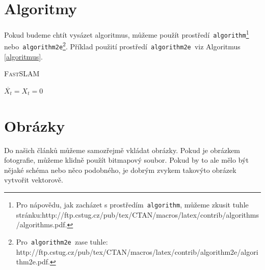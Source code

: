 \documentclass[11pt,a4paper]{article}
\begin{document}
	\section{Algoritmy} \label{algoritmy}
	Pokud budeme chtít vysázet algoritmus, můžeme použít prostředí\texttt{ algorithm}\footnote{Pro nápovědu, jak zacházet s prostředím\texttt{ algorithm}, můžeme zkusit tuhle stránku:\newline http://ftp.cstug.cz/pub/tex/CTAN/macros/latex/contrib/algorithms/algorithms.pdf.}\texttt{ }nebo\texttt{ algorithm2e}\footnote{Pro\texttt{ algorithm2e }zase tuhle: http://ftp.cstug.cz/pub/tex/CTAN/macros/latex/contrib/algorithm2e/algorithm2e.pdf.}. Příklad použití prostředí\texttt{ algorithm2e }viz Algoritmus \ref{algoritmus}. \\[1em]
	
	\IncMargin{1.5em}
	{\SetAlgoNoLine
	\begin{algorithm}[H] \label{algoritmus}
		\caption{\textsc{FastSLAM}}
		\SetNlSty{}{}{:}
				
		\Indm
		\BlankLine
		\Indp
		
		$\overline{X_t} = X_t = 0$ \\
	
	\end{algorithm}
	}
	\DecMargin{1.5em}
	\vspace{1em}
	
	\section{Obrázky}
	Do našich článků můžeme samozřejmě vkládat obrázky. Pokud je obrázkem fotografie,
	můžeme klidně použít bitmapový soubor. Pokud by to ale mělo být nějaké schéma nebo něco podobného, je dobrým zvykem takovýto obrázek vytvořit vektorově.
	
\end{document}
